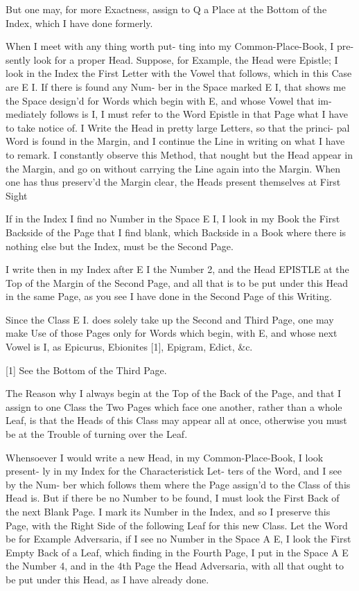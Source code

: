 But one may, for more Exactness, assign
to Q a Place at the Bottom of the Index,
which I have done formerly.

When I meet with any thing worth put-
ting into my Common-Place-Book, I pre-
sently look for a proper Head. Suppose,
for Example, the Head were Epistle; I
look in the Index the First Letter with
the Vowel that follows, which in this
Case are E I. If there is found any Num-
ber in the Space marked E I, that shows
me the Space design'd for Words which
begin with E, and whose Vowel that im-
mediately follows is I, I must refer to
the Word Epistle in that Page what I
have to take notice of. I Write the Head
in pretty large Letters, so that the princi-
pal Word is found in the Margin, and I
continue the Line in writing on what I
have to remark. I constantly observe this
Method, that nought but the Head appear
in the Margin, and go on without carrying
the Line again into the Margin. When
one has thus preserv'd the Margin clear,
the Heads present themselves at First Sight

If in the Index I find no Number in the
Space E I, I look in my Book the First
Backside of the Page that I find blank,
which Backside in a Book where there is
nothing else but the Index, must be the
Second Page.

I write then in my Index after E I the
Number 2, and the Head EPISTLE at
the Top of the Margin of the Second
Page, and all that is to be put under this
Head in the same Page, as you see I have
done in the Second Page of this Writing.

Since the Class E I. does solely take up
the Second and Third Page, one may make
Use of those Pages only for Words which
begin, with E, and whose next Vowel is I,
as Epicurus, Ebionites [1], Epigram, Edict, &c.

[1] See the Bottom of the Third Page.

The Reason why I always begin at the
Top of the Back of the Page, and that I
assign to one Class the Two Pages which
face one another, rather than a whole Leaf,
is that the Heads of this Class may appear
all at once, otherwise you must be at the
Trouble of turning over the Leaf.

Whensoever I would write a new Head,
in my Common-Place-Book, I look present-
ly in my Index for the Characteristick Let-
ters of the Word, and I see by the Num-
ber which follows them where the Page
assign'd to the Class of this Head is. But
if there be no Number to be found, I must
look the First Back of the next Blank Page.
I mark its Number in the Index, and so
I preserve this Page, with the Right Side
of the following Leaf for this new Class.
Let the Word be for Example Adversaria,
if I see no Number in the Space A E, I look
the First Empty Back of a Leaf, which
finding in the Fourth Page, I put in the
Space A E the Number 4, and in the 4th
Page the Head Adversaria, with all that
ought to be put under this Head, as I have
already done.

